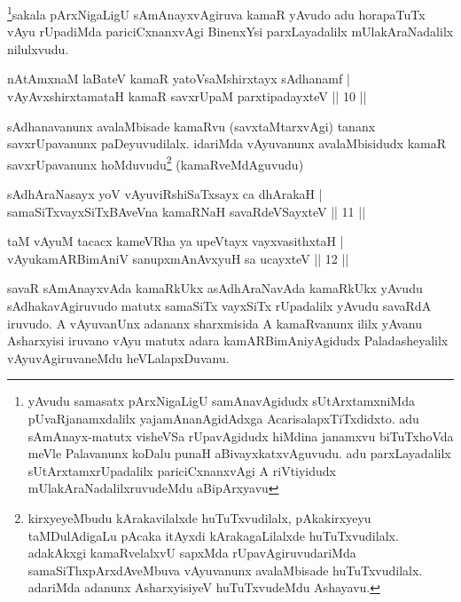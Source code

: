 \begin{artha}
\footnote{yAvudu samasatx pArxNigaLigU samAnavAgidudx sUtArxtamxniMda pUvaRjanamxdalilx yajamAnanAgidAdxga AcarisalapxTiTxdidxto. adu sAmAnayx-matutx visheVSa rUpavAgidudx hiMdina janamxvu biTuTxhoVda meVle Palavanunx koDalu punaH aBivayxkatxvAguvudu. adu parxLayadalilx sUtArxtamxrUpadalilx pariciCxnanxvAgi A riVtiyidudx mUlakAraNadalilxruvudeMdu aBipArxyavu}sakala pArxNigaLigU sAmAnayxvAgiruva kamaR yAvudo adu horapaTuTx vAyu rUpadiMda pariciCxnanxvAgi BinenxYsi parxLayadalilx mUlakAraNadalilx nilulxvudu.
\end{artha}


\begin{shl}
nA\s \s tAmxnaM laBateV kamaR yatoV\s saMshirxtayx sAdhanamf |\\
vAyAvxshirxtamataH kamaR savxrUpaM parxtipadayxteV \hfill || 10 ||
\end{shl}

\begin{artha}
sAdhanavanunx avalaMbisade kamaRvu (savxtaMtarxvAgi) tananx savxrUpavanunx paDeyuvudilalx. idariMda vAyuvanunx avalaMbisidudx kamaR savxrUpavanunx hoMduvudu\footnote{kirxyeyeMbudu kArakavilalxde huTuTxvudilalx, pAkakirxyeyu taMDulAdigaLu pAcaka itAyxdi kArakagaLilalxde huTuTxvudilalx. adakAkxgi kamaRvelalxvU sapxMda rUpavAgiruvudariMda samaSiThxpArxdAveMbuva vAyuvanunx avalaMbisade huTuTxvudilalx. adariMda adanunx AsharxyisiyeV huTuTxvudeMdu Ashayavu.} (kamaRveMdAguvudu)
\end{artha}


\begin{shl}
sAdhAraNasayx yoV vAyuviRshiSaTxsayx ca dhArakaH |\\
samaSiTxvayxSiTxBAveVna kamaRNaH savaRdeVSayxteV \hfill || 11 ||
\end{shl}

\begin{shl}
taM vAyuM tacacx kameVRha ya upeVtayx vayxvasithxtaH |\\
vAyukamARBimAniV sanupxmAnAvxyuH sa ucayxteV \hfill || 12 ||
\end{shl}

\begin{artha}
savaR sAmAnayxvAda kamaRkUkx asAdhAraNavAda kamaRkUkx yAvudu sAdhakavAgiruvudo matutx samaSiTx vayxSiTx rUpadalilx yAvudu savaRdA iruvudo. A vAyuvanUnx adananx sharxmisida A kamaRvanunx ililx yAvanu Asharxyisi iruvano vAyu matutx adara kamARBimAniyAgidudx Paladasheyalilx vAyuvAgiruvaneMdu heVLalapxDuvanu.
\end{artha}

